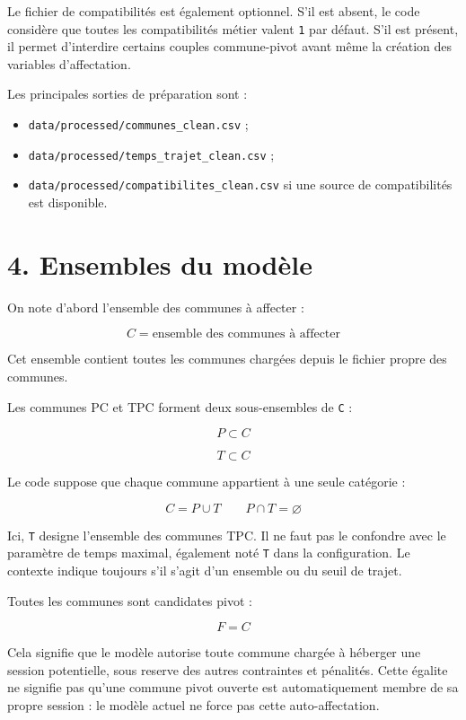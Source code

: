 \documentclass[11pt,a4paper]{article}
\begin{document}
Le fichier de compatibilités est également optionnel. S'il est absent, le code considère que toutes les compatibilités métier valent \texttt{1} par défaut. S'il est présent, il permet d'interdire certains couples commune-pivot avant même la création des variables d'affectation.

Les principales sorties de préparation sont :

\begin{itemize}
\item \texttt{data/processed/communes\_clean.csv} ;
\item \texttt{data/processed/temps\_trajet\_clean.csv} ;
\item \texttt{data/processed/compatibilites\_clean.csv} si une source de compatibilités est
disponible.

\end{itemize}

\section{4. Ensembles du modèle}

On note d'abord l'ensemble des communes à affecter :

\[
C = \text{ensemble des communes à affecter}
\]

Cet ensemble contient toutes les communes chargées depuis le fichier propre des communes.

Les communes PC et TPC forment deux sous-ensembles de \texttt{C} :

\[
P \subset C
\]

\[
T \subset C
\]

Le code suppose que chaque commune appartient à une seule catégorie :

\[
C = P \cup T
\qquad
P \cap T = \varnothing
\]

Ici, \texttt{T} designe l'ensemble des communes TPC. Il ne faut pas le confondre avec le paramètre de temps maximal, également noté \texttt{T} dans la configuration. Le contexte indique toujours s'il s'agit d'un ensemble ou du seuil de trajet.

Toutes les communes sont candidates pivot :

\[
F = C
\]

Cela signifie que le modèle autorise toute commune chargée à héberger une session potentielle, sous reserve des autres contraintes et pénalités. Cette égalite ne signifie pas qu'une commune pivot ouverte est automatiquement membre de sa propre session : le modèle actuel ne force pas cette auto-affectation.
\end{document}
